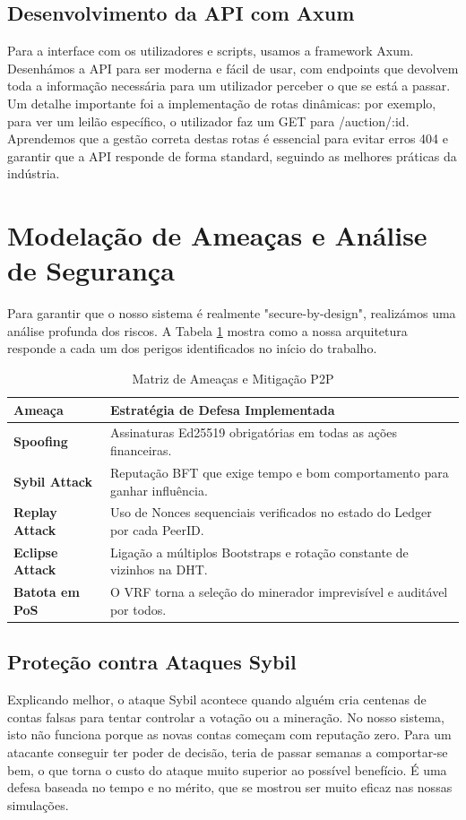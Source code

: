 \documentclass[11pt]{article}
\begin{document}
\subsection{Desenvolvimento da API com Axum}
Para a interface com os utilizadores e scripts, usamos a framework Axum. Desenhámos a API para ser moderna e fácil de usar, com endpoints que devolvem toda a informação necessária para um utilizador perceber o que se está a passar. Um detalhe importante foi a implementação de rotas dinâmicas: por exemplo, para ver um leilão específico, o utilizador faz um GET para /auction/:id. Aprendemos que a gestão correta destas rotas é essencial para evitar erros 404 e garantir que a API responde de forma standard, seguindo as melhores práticas da indústria.

\section{Modelação de Ameaças e Análise de Segurança}

Para garantir que o nosso sistema é realmente "secure-by-design", realizámos uma análise profunda dos riscos. A Tabela \ref{tab:threats} mostra como a nossa arquitetura responde a cada um dos perigos identificados no início do trabalho.

\begin{table}[H]
\centering
\caption{Matriz de Ameaças e Mitigação P2P}
\label{tab:threats}
\begin{tabular}{@{}p{3cm} p{11cm}@{}}
\toprule
\textbf{Ameaça} & \textbf{Estratégia de Defesa Implementada} \\ \midrule
\textbf{Spoofing} & Assinaturas Ed25519 obrigatórias em todas as ações financeiras. \\ \addlinespace
\textbf{Sybil Attack} & Reputação BFT que exige tempo e bom comportamento para ganhar influência. \\ \addlinespace
\textbf{Replay Attack} & Uso de Nonces sequenciais verificados no estado do Ledger por cada PeerID. \\ \addlinespace
\textbf{Eclipse Attack} & Ligação a múltiplos Bootstraps e rotação constante de vizinhos na DHT. \\ \addlinespace
\textbf{Batota em PoS} & O VRF torna a seleção do minerador imprevisível e auditável por todos. \\
\bottomrule
\end{tabular}
\end{table}

\subsection{Proteção contra Ataques Sybil}
Explicando melhor, o ataque Sybil acontece quando alguém cria centenas de contas falsas para tentar controlar a votação ou a mineração. No nosso sistema, isto não funciona porque as novas contas começam com reputação zero. Para um atacante conseguir ter poder de decisão, teria de passar semanas a comportar-se bem, o que torna o custo do ataque muito superior ao possível benefício. É uma defesa baseada no tempo e no mérito, que se mostrou ser muito eficaz nas nossas simulações.
\end{document}

